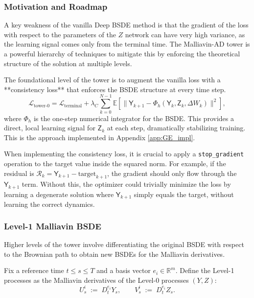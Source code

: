 \subsubsection{Motivation and Roadmap}
A key weakness of the vanilla Deep BSDE method is that the gradient of the loss with respect to the parameters of the \(Z\) network can have very high variance, as the learning signal comes only from the terminal time. The Malliavin-AD tower is a powerful hierarchy of techniques to mitigate this by enforcing the theoretical structure of the solution at multiple levels.

\begin{proposition}
The foundational level of the tower is to augment the vanilla loss with a **consistency loss** that enforces the BSDE structure at every time step.
\[
\mathcal{L}_{\text{tower-0}} = \mathcal{L}_{\text{terminal}} + \lambda_C \sum_{k=0}^{N-1} \mathbb{E}\left[ \| \mathsf{Y}_{k+1} - \Phi_h(\mathsf{Y}_k, \mathsf{Z}_k, \Delta W_k) \|^2 \right],
\]
where \(\Phi_h\) is the one-step numerical integrator for the BSDE. This provides a direct, local learning signal for \(\mathsf{Z}_k\) at each step, dramatically stabilizing training. This is the approach implemented in Appendix \ref{app:GE_impl}.
\end{proposition}

\begin{remark}
When implementing the consistency loss, it is crucial to apply a \texttt{stop\_gradient} operation to the target value inside the squared norm. For example, if the residual is $\mathcal{R}_k = \mathsf{Y}_{k+1} - \text{target}_{k+1}$, the gradient should only flow through the $\mathsf{Y}_{k+1}$ term. Without this, the optimizer could trivially minimize the loss by learning a degenerate solution where $\mathsf{Y}_{k+1}$ simply equals the target, without learning the correct dynamics.
\end{remark}

\subsubsection{Level-1 Malliavin BSDE}
Higher levels of the tower involve differentiating the original BSDE with respect to the Brownian path to obtain new BSDEs for the Malliavin derivatives.

\begin{definition}
Fix a reference time \(t\le s\le T\) and a basis vector \(e_i \in \mathbb{R}^m\). Define the Level-1 processes as the Malliavin derivatives of the Level-0 processes \((Y,Z)\):
\[
  U^{i}_{s}\;:=\;D_t^{e_i}Y_{s},
  \qquad
  V^{i}_{s}\;:=\;D_t^{e_i}Z_{s}.
\]
\end{definition}


